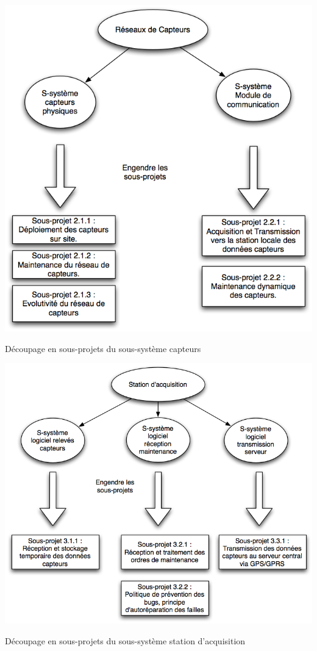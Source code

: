 \begin {center}
\includegraphics[width=\textwidth]{png/ss1Capteurs.png}
\caption{Découpage en sous-projets du sous-système capteurs}
\end {center}

\begin {center}
\includegraphics[width=\textwidth]{png/ss3Station.png}
\caption{Découpage en sous-projets du sous-système station d'acquisition}
\end {center}


